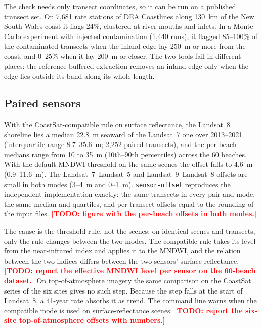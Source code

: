 \documentclass[authoryear,preprint,review,12pt]{elsarticle}
\newcommand{\todo}[1]{\textcolor{red}{\textbf{[TODO: #1]}}}
\begin{document}
The check needs only transect coordinates, so it can be run on a published
transect set. On 7,681 rate stations of DEA Coastlines \citep{BishopTaylor_2021}
along 130~km of the New South Wales coast it flags 24\%, clustered at river
mouths and inlets. In a Monte Carlo experiment with injected contamination
(1,440 runs), it flagged 85--100\% of the contaminated transects when the
inland edge lay 250~m or more from the coast, and 0--25\% when it lay 200~m or
closer. The two tools fail in different places: the reference-buffered
extraction removes an inland edge only when the edge lies outside its band
along its whole length.

\subsection{Paired sensors}\label{subsec:res_sensor}
With the CoastSat-compatible rule on surface reflectance, the Landsat~8
shoreline lies a median 22.8~m seaward of the Landsat~7 one over 2013--2021
(interquartile range 8.7--35.6~m; 2,252 paired transects), and the per-beach
medians range from 10 to 35~m (10th--90th percentiles) across the 60 beaches.
With the default MNDWI threshold on the same scenes the offset falls to 4.6~m
(0.9--11.6~m). The Landsat~7--Landsat~5 and Landsat~9--Landsat~8 offsets are
small in both modes (3--4~m and 0--1~m). \texttt{sensor-offset} reproduces the
independent implementation exactly: the same transects in every pair and mode,
the same median and quartiles, and per-transect offsets equal to the rounding
of the input files.
\todo{figure with the per-beach offsets in both modes.}

The cause is the threshold rule, not the scenes: on identical scenes and
transects, only the rule changes between the two modes. The compatible rule
takes its level from the near-infrared index and applies it to the MNDWI, and
the relation between the two indices differs between the two sensors' surface
reflectance. \todo{report the effective MNDWI level per sensor on the 60-beach
dataset.} On top-of-atmosphere imagery
the same comparison on the CoastSat series of the six sites gives no such
step. Because the step falls at the start of Landsat~8, a 41-year rate absorbs
it as trend. The command line warns when the compatible mode is used on
surface-reflectance scenes.
\todo{report the six-site top-of-atmosphere offsets with numbers.}
\end{document}
